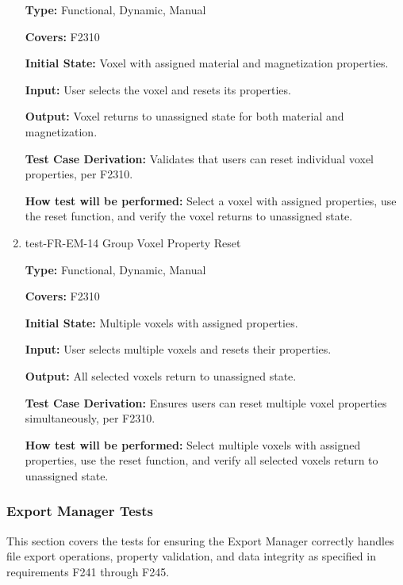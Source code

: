 \documentclass[12pt, titlepage]{article}
\begin{document}
\begin{enumerate}
\textbf{Type:} Functional, Dynamic, Manual

\textbf{Covers:} F2310
					
\textbf{Initial State:} Voxel with assigned material and magnetization properties.
					
\textbf{Input:} User selects the voxel and resets its properties.
					
\textbf{Output:} Voxel returns to unassigned state for both material and magnetization.

\textbf{Test Case Derivation:} Validates that users can reset individual voxel properties, per F2310.
					
\textbf{How test will be performed:} Select a voxel with assigned properties, use the reset function, and verify the voxel returns to unassigned state.

\item{test-FR-EM-14 Group Voxel Property Reset\\}

\textbf{Type:} Functional, Dynamic, Manual

\textbf{Covers:} F2310
					
\textbf{Initial State:} Multiple voxels with assigned properties.
					
\textbf{Input:} User selects multiple voxels and resets their properties.
					
\textbf{Output:} All selected voxels return to unassigned state.

\textbf{Test Case Derivation:} Ensures users can reset multiple voxel properties simultaneously, per F2310.
					
\textbf{How test will be performed:} Select multiple voxels with assigned properties, use the reset function, and verify all selected voxels return to unassigned state.


\end{enumerate}


\subsubsection{Export Manager Tests}

This section covers the tests for ensuring the Export Manager correctly
handles file export operations, property validation, and data integrity
as specified in requirements F241 through F245.
\end{document}
